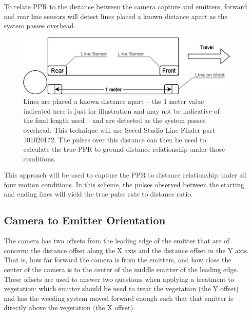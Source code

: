 \documentclass[12pt]{article}
\begin{document}
To relate PPR to the distance between the camera capture and emitters, forward and rear line sensors will detect lines placed a known distance apart as the system passes overhead.
\begin{figure}[H]
	\centering
	\includegraphics[width=0.75\linewidth]{./figures/determine-ppr-per-meter.jpg}
	\caption[Determine PPR per meter]{Lines are placed a known distance apart -- the 1 meter value indicated here is just for illustration and may not be indicative of the final length used -- and are detected as the system passes overhead. This technique will use Seeed Studio Line Finder part 101020172. The pulses over this distance can then be used to calculate the true PPR to ground-distance relationship under those conditions.}
	\label{fig:ppr-to-meter}
\end{figure}

This approach will be used to capture the PPR to distance relationship under all four motion conditions. In this scheme, the pulses observed between the starting and ending lines will yield the true pulse rate to distance ratio.

\subsection{Camera to Emitter Orientation}
The camera has two offsets from the leading edge of the emitter that are of concern: the distance offset along the X axis and the distance offset in the Y axis. That is, how far forward the camera is from the emitters, and how close the center of the camera is to the center of the middle emitter of the leading edge. These offsets are used to answer two questions when applying a treatment to vegetation: which emitter should be used to treat the vegetation (the Y offset) and has the weeding system moved forward enough such that that emitter is directly above the vegetation (the X offset).
\end{document}
